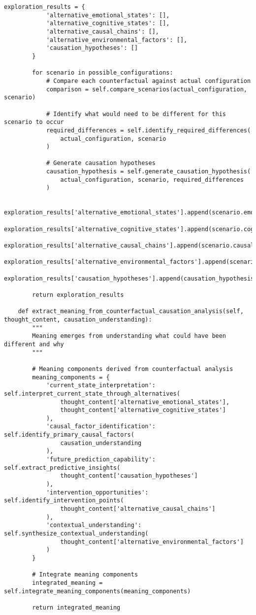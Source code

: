 \documentclass[12pt,a4paper]{article}
\begin{document}
\begin{lstlisting}[style=pythonstyle, caption=Counterfactual BMD Meaning Synthesis Engine]
        exploration_results = {
            'alternative_emotional_states': [],
            'alternative_cognitive_states': [],
            'alternative_causal_chains': [],
            'alternative_environmental_factors': [],
            'causation_hypotheses': []
        }
        
        for scenario in possible_configurations:
            # Compare each counterfactual against actual configuration
            comparison = self.compare_scenarios(actual_configuration, scenario)
            
            # Identify what would need to be different for this scenario to occur
            required_differences = self.identify_required_differences(
                actual_configuration, scenario
            )
            
            # Generate causation hypotheses
            causation_hypothesis = self.generate_causation_hypothesis(
                actual_configuration, scenario, required_differences
            )
            
            exploration_results['alternative_emotional_states'].append(scenario.emotional_state)
            exploration_results['alternative_cognitive_states'].append(scenario.cognitive_state)
            exploration_results['alternative_causal_chains'].append(scenario.causal_chain)
            exploration_results['alternative_environmental_factors'].append(scenario.environmental_factors)
            exploration_results['causation_hypotheses'].append(causation_hypothesis)
        
        return exploration_results
    
    def extract_meaning_from_counterfactual_causation_analysis(self, thought_content, causation_understanding):
        """
        Meaning emerges from understanding what could have been different and why
        """
        
        # Meaning components derived from counterfactual analysis
        meaning_components = {
            'current_state_interpretation': self.interpret_current_state_through_alternatives(
                thought_content['alternative_emotional_states'],
                thought_content['alternative_cognitive_states']
            ),
            'causal_factor_identification': self.identify_primary_causal_factors(
                causation_understanding
            ),
            'future_prediction_capability': self.extract_predictive_insights(
                thought_content['causation_hypotheses']
            ),
            'intervention_opportunities': self.identify_intervention_points(
                thought_content['alternative_causal_chains']
            ),
            'contextual_understanding': self.synthesize_contextual_understanding(
                thought_content['alternative_environmental_factors']
            )
        }
        
        # Integrate meaning components
        integrated_meaning = self.integrate_meaning_components(meaning_components)
        
        return integrated_meaning
\end{lstlisting}
\end{document}
